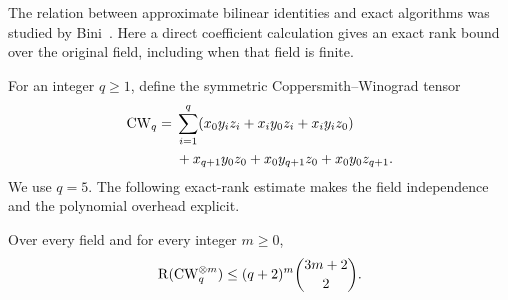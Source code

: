 The relation between approximate bilinear identities and exact algorithms
was studied by Bini~\cite{Bini1980}.  Here a direct coefficient calculation
gives an exact rank bound over the original field, including when that
field is finite.

For an integer $q\geq1$, define the symmetric Coppersmith--Winograd
tensor~\cite{CoppersmithWinograd1990}
\begin{align*}
 \mathrm{CW}_q={}&\sum_{i=1}^q
  (x_0y_iz_i+x_iy_0z_i+x_iy_iz_0)\\
 &+x_{q+1}y_0z_0+x_0y_{q+1}z_0+x_0y_0z_{q+1}.
\end{align*}
We use $q=5$.  The following exact-rank estimate makes the field
independence and the polynomial overhead explicit.

\begin{lemma}\label{lem:cw-rank}
Over every field and for every integer $m\geq0$,
\begin{equation}\label{eq:cw-power-rank}
 \operatorname{R}(\mathrm{CW}_q^{\otimes m})
      \leq(q+2)^m\binom{3m+2}{2}.
\end{equation}
\end{lemma}


